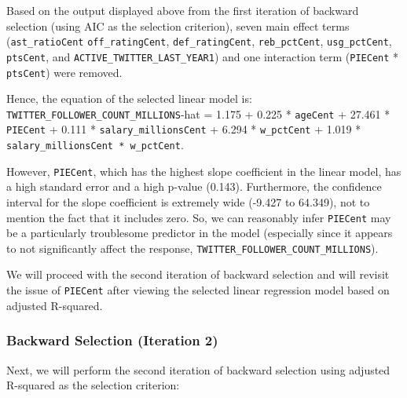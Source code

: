 \documentclass[]{article}
\begin{document}
Based on the output displayed above from the first iteration of backward
selection (using AIC as the selection criterion), seven main effect
terms (\texttt{ast\_ratioCent} \texttt{off\_ratingCent},
\texttt{def\_ratingCent}, \texttt{reb\_pctCent}, \texttt{usg\_pctCent},
\texttt{ptsCent}, and \texttt{ACTIVE\_TWITTER\_LAST\_YEAR1}) and one
interaction term (\texttt{PIECent} * \texttt{ptsCent}) were removed.

Hence, the equation of the selected linear model is:
\texttt{TWITTER\_FOLLOWER\_COUNT\_MILLIONS}-hat = 1.175 + 0.225 *
\texttt{ageCent} + 27.461 * \texttt{PIECent} + 0.111 *
\texttt{salary\_millionsCent} + 6.294 * \texttt{w\_pctCent} + 1.019 *
\texttt{salary\_millionsCent\ *\ w\_pctCent}.

However, \texttt{PIECent}, which has the highest slope coefficient in
the linear model, has a high standard error and a high p-value (0.143).
Furthermore, the confidence interval for the slope coefficient is
extremely wide (-9.427 to 64.349), not to mention the fact that it
includes zero. So, we can reasonably infer \texttt{PIECent} may be a
particularly troublesome predictor in the model (especially since it
appears to not significantly affect the response,
\texttt{TWITTER\_FOLLOWER\_COUNT\_MILLIONS}).

We will proceed with the second iteration of backward selection and will
revisit the issue of \texttt{PIECent} after viewing the selected linear
regression model based on adjusted R-squared.

\hypertarget{backward-selection-iteration-2}{%
\subsubsection{Backward Selection (Iteration
2)}\label{backward-selection-iteration-2}}

Next, we will perform the second iteration of backward selection using
adjusted R-squared as the selection criterion:
\end{document}
